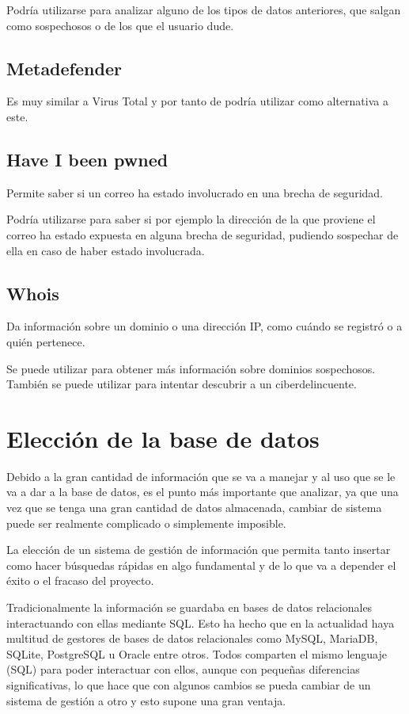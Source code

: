 Podría utilizarse para analizar alguno de los tipos de datos anteriores, que salgan como sospechosos o de los que el usuario dude.

\subsection{Metadefender}
Es muy similar a Virus Total y por tanto de podría utilizar como alternativa a este. 

\subsection{Have I been pwned}
Permite saber si un correo ha estado involucrado en una brecha de seguridad. 

Podría utilizarse para saber si por ejemplo la dirección de la que proviene el correo ha estado expuesta en alguna brecha de seguridad, pudiendo sospechar de ella en caso de haber estado involucrada. 

\subsection{Whois}
Da información sobre un dominio o una dirección IP, como cuándo se registró o a quién pertenece.

Se puede utilizar para obtener más información sobre dominios sospechosos. También se puede utilizar para intentar descubrir a un ciberdelincuente. 

\section{Elección de la base de datos}
Debido a la gran cantidad de información que se va a manejar y al uso que se le va a dar a la base de datos, es el punto más importante que analizar, ya que una vez que se tenga una gran cantidad de datos almacenada, cambiar de sistema puede ser realmente complicado o simplemente imposible. 

La elección de un sistema de gestión de información que permita tanto insertar como hacer búsquedas rápidas en algo fundamental y de lo que va a depender el éxito o el fracaso del proyecto.

Tradicionalmente la información se guardaba en bases de datos relacionales interactuando con ellas mediante SQL. Esto ha hecho que en la actualidad haya multitud de gestores de bases de datos relacionales como MySQL\cite{MySQL}, MariaDB\cite{MariaDB}, SQLite\cite{SQLite}, PostgreSQL\cite{PostgreSQL} u Oracle\cite{Oracle} entre otros. Todos comparten el mismo lenguaje (SQL) para poder interactuar con ellos, aunque con pequeñas diferencias significativas, lo que hace que con algunos cambios se pueda cambiar de un sistema de gestión a otro y esto supone una gran ventaja.

